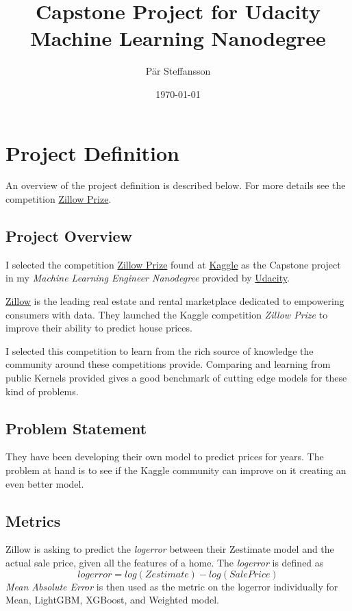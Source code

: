 \documentclass[a4paper]{article}
\title{Capstone Project for Udacity Machine Learning Nanodegree}
\author{Pär Steffansson}
\date{\today}
\begin{document}
\maketitle

\tableofcontents

\section{Project Definition}
An overview of the project definition is described below. For more details see the competition
\href{https://www.kaggle.com/c/zillow-prize-1#description}{Zillow Prize}.

\subsection{Project Overview}
%
%
I selected the competition \href{https://www.kaggle.com/c/zillow-prize-1#description}{Zillow Prize} found at
\href{https://www.kaggle.com}{Kaggle} as the Capstone project in my \textit{Machine Learning Engineer Nanodegree}
provided by \href{https://www.udacity.com}{Udacity}.

\href{https://www.zillow.com}{Zillow} is the leading real estate and rental marketplace dedicated to empowering
consumers with data. They launched the Kaggle competition \textit{Zillow Prize} to improve their ability to predict
house prices.

I selected this competition to learn from the rich source of knowledge the community around these competitions
provide. Comparing and learning from public Kernels provided gives a good benchmark of cutting edge models
for these kind of problems.

\subsection{Problem Statement}
%
%
They have been developing their own model to predict prices for years. The problem at hand is to see if the
Kaggle community can improve on it creating an even better model.

\subsection{Metrics}
%
%
Zillow is asking to predict the \textit{logerror} between their Zestimate model and the
actual sale price, given all the features of a home. The \textit{logerror} is defined as
\[ logerror = log(Zestimate) - log(SalePrice) \]
\textit{Mean Absolute Error} is then used as the metric on the logerror individually for Mean, LightGBM,
XGBoost, and Weighted model.
\end{document}
